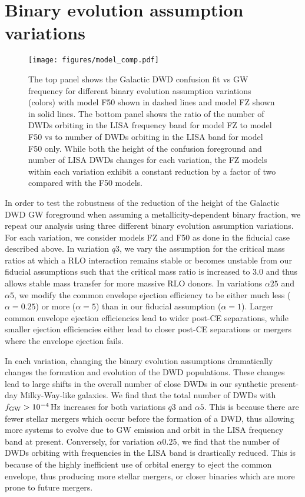 \documentclass[twocolumn, linenumbers]{aastex631}
\begin{document}
\section{Binary evolution assumption variations}
\label{sec:model_compare}

\begin{figure}
	\texttt{[image: figures/model\_comp.pdf]}
    \caption{The top panel shows the Galactic DWD confusion fit vs GW frequency for different binary evolution assumption variations (colors) with model F50 shown in dashed lines and model FZ shown in solid lines. The bottom panel shows the ratio of the number of DWDs orbiting in the LISA frequency band for model FZ to model F50 vs to number of DWDs orbiting in the LISA band for model F50 only. While both the height of the confusion foreground and number of LISA DWDs changes for each variation, the FZ models within each variation exhibit a constant reduction by a factor of two compared with the F50 models.}
    \label{fig:model_comp}
\end{figure}

In order to test the robustness of the reduction of the height of the Galactic DWD GW foreground when assuming a metallicity-dependent binary fraction, we repeat our analysis using three different binary evolution assumption variations. For each variation, we consider models FZ and F50 as done in the fiducial case described above. In variation $q3$, we vary the assumption for the critical mass ratios at which a RLO interaction remains stable or becomes unstable from our fiducial assumptions such that the critical mass ratio is increased to $3.0$ and thus allows stable mass transfer for more massive RLO donors. In variations $\alpha25$ and $\alpha5$, we modify the common envelope ejection efficiency to be either much less ($\alpha=0.25$) or more ($\alpha=5$) than in our fiducial assumption ($\alpha=1$). Larger common envelope ejection efficiencies lead to wider post-CE separations, while smaller ejection efficiencies either lead to closer post-CE separations or mergers where the envelope ejection fails. 

In each variation, changing the binary evolution assumptions dramatically changes the formation and evolution of the DWD populations. These changes lead to large shifts in the overall number of close DWDs in our synthetic present-day Milky-Way-like galaxies. We find that the total number of DWDs with $f_{\rm{GW}}>10^{-4}\,\rm{Hz}$ increases for both variations $q3$ and $\alpha5$. This is because there are fewer stellar mergers which occur before the formation of a DWD, thus allowing more systems to evolve due to GW emission and orbit in the LISA frequency band at present. Conversely, for variation $\alpha0.25$, we find that the number of DWDs orbiting with frequencies in the LISA band is drastically reduced. This is because of the highly inefficient use of orbital energy to eject the common envelope, thus producing more stellar mergers, or closer binaries which are more prone to future mergers.
\end{document}
